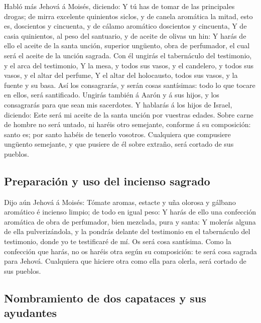  Habló más Jehová á Moisés, diciendo:  Y
tú has de tomar de las principales drogas; de mirra excelente quinientos
siclos, y de canela aromática la mitad, esto es, doscientos y cincuenta,
y de cálamo aromático doscientos y cincuenta,  Y de casia
quinientos, al peso del santuario, y de aceite de olivas un hin:
 Y harás de ello el aceite de la santa unción, superior
ungüento, obra de perfumador, el cual será el aceite de la unción
sagrada.  Con él ungirás el tabernáculo del testimonio, y
el arca del testimonio,  Y la mesa, y todos sus vasos, y
el candelero, y todos sus vasos, y el altar del perfume, 
Y el altar del holocausto, todos sus vasos, y la fuente y su basa.
 Así los consagrarás, y serán cosas santísimas: todo lo
que tocare en ellos, será santificado.  Ungirás también á
Aarón y á sus hijos, y los consagrarás para que sean mis sacerdotes.
 Y hablarás á los hijos de Israel, diciendo: Este será mi
aceite de la santa unción por vuestras edades.  Sobre
carne de hombre no será untado, ni haréis otro semejante, conforme á su
composición: santo es; por santo habéis de tenerlo vosotros.
 Cualquiera que compusiere ungüento semejante, y que
pusiere de él sobre extraño, será cortado de sus pueblos.

\hypertarget{preparaciuxf3n-y-uso-del-incienso-sagrado}{%
\subsection{Preparación y uso del incienso
sagrado}\label{preparaciuxf3n-y-uso-del-incienso-sagrado}}

 Dijo aún Jehová á Moisés: Tómate aromas, estacte y uña
olorosa y gálbano aromático é incienso limpio; de todo en igual peso:
 Y harás de ello una confección aromática de obra de
perfumador, bien mezclada, pura y santa:  Y molerás
alguna de ella pulverizándola, y la pondrás delante del testimonio en el
tabernáculo del testimonio, donde yo te testificaré de mí. Os será cosa
santísima.  Como la confección que harás, no os haréis
otra según su composición: te será cosa sagrada para Jehová.
 Cualquiera que hiciere otra como ella para olerla, será
cortado de sus pueblos.

\hypertarget{nombramiento-de-dos-capataces-y-sus-ayudantes}{%
\subsection{Nombramiento de dos capataces y sus
ayudantes}\label{nombramiento-de-dos-capataces-y-sus-ayudantes}}

